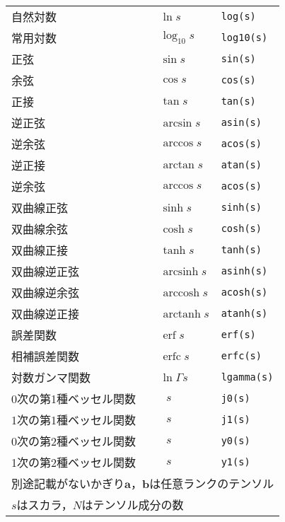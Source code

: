 \begin{longtable}{Xlll}
 自然対数 &  & $\ln s$ & \verb|log(s)| \\
 常用対数 &  & $\log_{10}s$ & \verb|log10(s)| \\
 正弦 &  & $\sin s$ & \verb|sin(s)| \\
 余弦 &  & $\cos s$ & \verb|cos(s)| \\
 正接 &  & $\tan s$ & \verb|tan(s)| \\
 逆正弦 &  & $\arcsin s$ & \verb|asin(s)| \\
 逆余弦 &  & $\arccos s$ & \verb|acos(s)| \\
 逆正接 &  & $\arctan s$ & \verb|atan(s)| \\
 逆余弦 &  & $\arccos s$ & \verb|acos(s)| \\
 双曲線正弦 &  & $\sinh s$ & \verb|sinh(s)| \\
 双曲線余弦 &  & $\cosh s$ & \verb|cosh(s)| \\
 双曲線正接 &  & $\tanh s$ & \verb|tanh(s)| \\
 双曲線逆正弦 &  & $\mathop{\mathrm{arcsinh}} s$ & \verb|asinh(s)| \\
 双曲線逆余弦 &  & $\mathop{\mathrm{arccosh}} s$ & \verb|acosh(s)| \\
 双曲線逆正接 &  & $\mathop{\mathrm{arctanh}} s$ & \verb|atanh(s)| \\
 誤差関数 &  & $\mathop{\mathrm{erf}} s$ & \verb|erf(s)| \\
 相補誤差関数 &  & $\mathop{\mathrm{erfc}} s$ & \verb|erfc(s)| \\
 対数ガンマ関数 &  & $\ln\Gamma s$ & \verb|lgamma(s)| \\
 0次の第1種ベッセル関数 &  & $\mathop{J_{0}}s$ & \verb|j0(s)| \\
 1次の第1種ベッセル関数 &  & $\mathop{J_{1}}s$ & \verb|j1(s)| \\
 0次の第2種ベッセル関数 &  & $\mathop{Y_{0}}s$ & \verb|y0(s)| \\
 1次の第2種ベッセル関数 &  & $\mathop{Y_{1}}s$ & \verb|y1(s)| \\
 \hline
 \multicolumn{4}{l}{\tblstrut 別途記載がないかぎり$\bm{a}$，$\bm{b}$は任意ランクのテンソル} \\
 \multicolumn{4}{l}{$s$はスカラ，$N$はテンソル成分の数} \\
\end{longtable}


